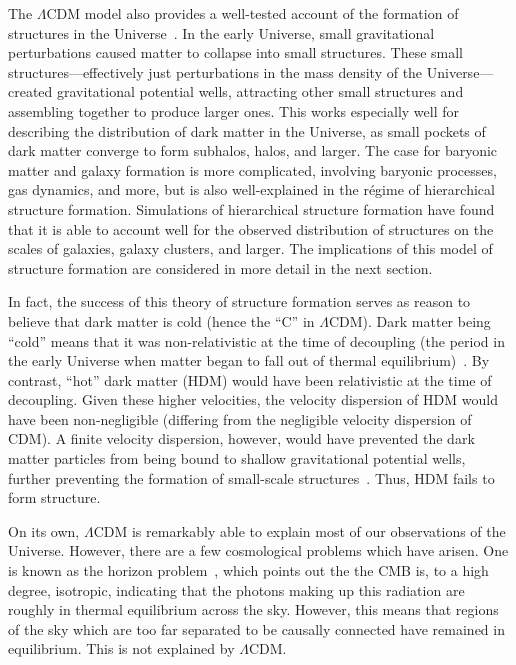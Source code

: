 The \(\Lambda\)CDM model also provides a well-tested account of the formation
of structures in the Universe~\cite{dodelson_modern_2021}. In the early
Universe, small gravitational perturbations caused matter to collapse into
small structures. These small structures---effectively just perturbations in
the mass density of the Universe---created gravitational potential wells,
attracting other small structures and assembling together to produce larger
ones. This works especially well for describing the distribution of dark
matter in the Universe, as small pockets of dark matter converge to form
subhalos, halos, and larger. The case for baryonic matter and galaxy formation
is more complicated, involving baryonic processes, gas dynamics, and more, but
is also well-explained in the régime of hierarchical structure formation.
Simulations of hierarchical structure formation have found that it is able to
account well for the observed distribution of structures on the scales of
galaxies, galaxy clusters, and larger. The implications of this model of
structure formation are considered in more detail in the next section.

In fact, the success of this theory of structure formation serves as reason to
believe that dark matter is cold (hence the ``C'' in \(\Lambda\)CDM). Dark
matter being ``cold'' means that it was non-relativistic at the time of
decoupling (the period in the early Universe when matter began to fall out of
thermal equilibrium)~\cite{mohanty_astroparticle_2020}. By contrast, ``hot'' dark matter
(HDM) would have been relativistic at the time of decoupling. Given these
higher velocities, the velocity dispersion of HDM would have been
non-negligible (differing from the negligible velocity dispersion of CDM). A
finite velocity dispersion, however, would have prevented the dark matter
particles from being bound to shallow gravitational potential wells, further
preventing the formation of small-scale
structures~\cite{schneider_extragalactic_2015}. Thus, HDM fails to form
structure.

On its own, \(\Lambda\)CDM is remarkably able to explain most of our
observations of the Universe. However, there are a few cosmological problems
which have arisen. One is known as the horizon
problem~\cite{bergstrom_cosmology_2008,schneider_extragalactic_2015}, which
points out the the CMB is, to a high degree, isotropic, indicating that the
photons making up this radiation are roughly in thermal equilibrium across the
sky. However, this means that regions of the sky which are too far separated
to be causally connected have remained in equilibrium. This is not explained
by \(\Lambda\)CDM.

